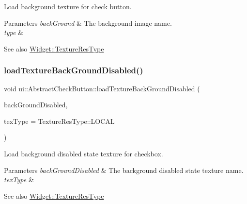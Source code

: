 Load background texture for check button.


\begin{DoxyParams}{Parameters}
{\em back\+Ground} & The background image name. \\
\hline
{\em type} & \\
\hline
\end{DoxyParams}
\begin{DoxySeeAlso}{See also}
{\ttfamily \hyperlink{classui_1_1Widget_a040a65ec5ad3b11119b7e16b98bd9af0}{Widget\+::\+Texture\+Res\+Type}} 
\end{DoxySeeAlso}
\mbox{\label{classui_1_1AbstractCheckButton_a6571d84aee7a30b97be6488dd08b6690}} 
\subsubsection{\texorpdfstring{load\+Texture\+Back\+Ground\+Disabled()}{loadTextureBackGroundDisabled()}\hspace{0.1cm}{\footnotesize\ttfamily [1/2]}}
{\footnotesize\ttfamily void ui\+::\+Abstract\+Check\+Button\+::load\+Texture\+Back\+Ground\+Disabled (\begin{DoxyParamCaption}\item[{const std\+::string \&}]{back\+Ground\+Disabled,  }\item[{\hyperlink{classui_1_1Widget_a040a65ec5ad3b11119b7e16b98bd9af0}{Texture\+Res\+Type}}]{tex\+Type = {\ttfamily TextureResType\+:\+:LOCAL} }\end{DoxyParamCaption})}

Load background disabled state texture for checkbox.


\begin{DoxyParams}{Parameters}
{\em back\+Ground\+Disabled} & The background disabled state texture name.\\
\hline
{\em tex\+Type} & \\
\hline
\end{DoxyParams}
\begin{DoxySeeAlso}{See also}
{\ttfamily \hyperlink{classui_1_1Widget_a040a65ec5ad3b11119b7e16b98bd9af0}{Widget\+::\+Texture\+Res\+Type}} 
\end{DoxySeeAlso}
\mbox{\label{classui_1_1AbstractCheckButton_a6571d84aee7a30b97be6488dd08b6690}} 
